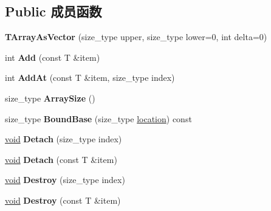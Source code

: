 \subsection*{Public 成员函数}
\begin{DoxyCompactItemize}
\item 
\mbox{\label{class_t_array_as_vector_a05ba3be39a149f2cd15754461a8d0dcd}} 
{\bfseries T\+Array\+As\+Vector} (size\+\_\+type upper, size\+\_\+type lower=0, int delta=0)
\item 
\mbox{\label{class_t_array_as_vector_a27427b17d153f1febe232801e98c959d}} 
int {\bfseries Add} (const T \&item)
\item 
\mbox{\label{class_t_array_as_vector_a8c365dba1228f20452ad60048c52375b}} 
int {\bfseries Add\+At} (const T \&item, size\+\_\+type index)
\item 
\mbox{\label{class_t_array_as_vector_a0c85ae407e83a954c9875c50288f507b}} 
size\+\_\+type {\bfseries Array\+Size} ()
\item 
\mbox{\label{class_t_array_as_vector_a3375d3240e12c91ee0fad455d00e75d6}} 
size\+\_\+type {\bfseries Bound\+Base} (size\+\_\+type \hyperlink{structlocation}{location}) const
\item 
\mbox{\label{class_t_array_as_vector_a6a7b17f38c5b3627467c6ba264041ab6}} 
\hyperlink{interfacevoid}{void} {\bfseries Detach} (size\+\_\+type index)
\item 
\mbox{\label{class_t_array_as_vector_a0185c25d83141a62ec60347614a6a994}} 
\hyperlink{interfacevoid}{void} {\bfseries Detach} (const T \&item)
\item 
\mbox{\label{class_t_array_as_vector_a46cc2e3ca03c6bbdc4207621a88f1637}} 
\hyperlink{interfacevoid}{void} {\bfseries Destroy} (size\+\_\+type index)
\item 
\mbox{\label{class_t_array_as_vector_a9ece2450ab42b36b6f1d8b09847fa773}} 
\hyperlink{interfacevoid}{void} {\bfseries Destroy} (const T \&item)

\end{DoxyCompactItemize}
